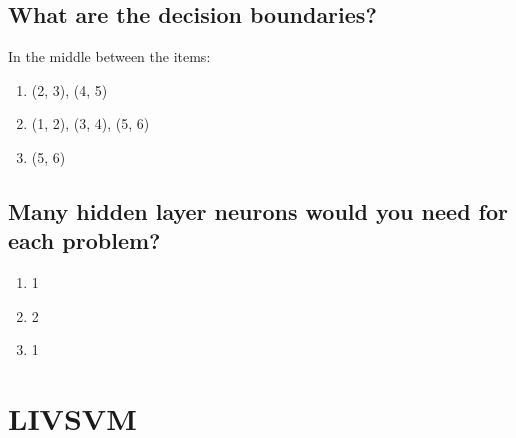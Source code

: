 \documentclass{scrartcl}
\begin{document}
\subsection{What are the decision boundaries?}
In the middle between the items:

\begin{enumerate}[label=(\alph*)]
\item (2, 3), (4, 5)
\item (1, 2), (3, 4), (5, 6)
\item (5, 6)
\end{enumerate}

\subsection{Many hidden layer neurons would you need for each problem?
}
\begin{enumerate}[label=(\alph*)]
\item 1
\item 2
\item 1 
\end{enumerate}

\section{LIVSVM
}









%



\end{document}
